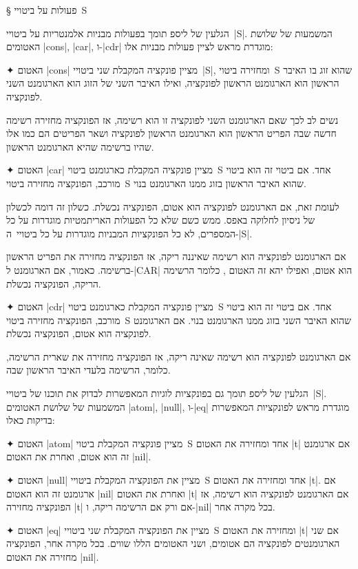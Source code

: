 \documentclass[a4paper,12pt,reqno]{article}
\begin{document}
§ פעולות על ביטויי~S

הגלעין של ליספ תומך בפעולות מבניות אלמנטריות על ביטויי~\E|S|. המשמעות של שלושת
האטומים \T|cons|, \T|car|, ו-\T|cdr| מוגדרת מראש לציין פעולות מבניות אלו:

\begin{enumerate}
  ✦ האטום \T|cons| מציין פונקציה המקבלת שני ביטויי~\E|S|, ומחזירה ביטוי~S
  שהוא זוג בו האיבר הראשון הוא הארגומנט הראשון לפונקציה, ואילו האיבר השני של
  הזוג הוא הארגומנט השני לפונקציה.

  נשים לב לכך שאם הארגומנט השני לפונקציה זו הוא רשימה, אז הפונקציה מחזירה
  רשימה חדשה שבה הפריט הראשון הוא הארגומנט הראשון לפונקציה ושאר
  הפריטים הם כמו אלו שהיו ברשימה שהיא הארגומנט הראשון.

  ✦ האטום \T|car| מציין פונקציה המקבלת כארגומנט ביטוי~S אחד. אם ביטוי זה הוא
  ביטוי מורכב, הפונקציה מחזירה ביטוי~S שהוא האיבר הראשון בזוג ממנו הארגומנט
  בנוי.

  לעומת זאת, אם הארגומנט לפונקציה הוא אטום, הפונקציה נכשלת. כשלון זה דומה
  לכשלון של ניסיון לחלוקה באפס. ממש כשם שלא כל הפעולות האריתמטיות מוגדרות על כל
  המספרים, לא כל הפונקציות המבניות מוגדרות על כל ביטויי~ה-\E|S|.

  אם הארגומנט לפונקציה הוא רשימה שאיננה ריקה, אז הפונקציה מחזירה את הפריט
  הראשון ברשימה. כאמור, אם הארגומנט ל-\E|CAR| הוא אטום, ואפילו יהא זה
  האטום , כלומר הרשימה הריקה, הפונקציה נכשלת.

  ✦ האטום \T|cdr| מציין פונקציה המקבלת כארגומנט ביטוי~S אחד. אם ביטוי זה הוא
  ביטוי מורכב, הפונקציה מחזירה ביטוי~S שהוא האיבר השני בזוג ממנו הארגומנט בנוי.
  אם הארגומנט לפונקציה הוא אטום, הפונקציה נכשלת.

  אם הארגומנט לפונקציה הוא רשימה שאינה ריקה, אז הפונקציה מחזירה את
  שארית הרשימה, כלומר, הרשימה בלעדי האיבר הראשון שבה.
\end{enumerate}

הגלעין של ליספ תומך גם בפונקציות לוגיות המאפשרות לבדוק את תוכנו של
ביטויי~\E|S|. המשמעות של שלושת האטומים \T|atom|, \T|null|, ו-\T|eq| מוגדרת
מראש לפונקציות המאפשרות בדיקות כאלו:

\begin{enumerate}
  ✦ האטום \T|atom| מציין פונקציה המקבלת ביטוי~S אחד ומחזירה את האטום \T|t| אם
  ארגומנט זה הוא אטום, ואחרת את האטום \T|nil|.

  ✦ האטום \T|null| מציין את הפונקציה המקבלת ביטויי~S אחד ומחזירה את האטום
  \T|t|. אם ארגומנט זה הוא האטום \T|nil| ואחרת את האטום \T|t| אם הארגומנט
  לפונקציה הוא רשימה, אז הפונקציה מחזירה \T|t| אם ורק אם הרשימה ריקה, ו-\T|nil|
  בכל מקרה אחר.

  ✦ האטום \T|eq| מציין את הפונקציה המקבלת שני ביטויי~S ומחזירה את האטום \T|t|
  אם שני הארגומנטים לפונקציה הם אטומים, ושני האטומים הללו שווים. בכל מקרה אחר,
  הפונקציה מחזירה את האטום \T|nil|.
\end{enumerate}
\end{document}
